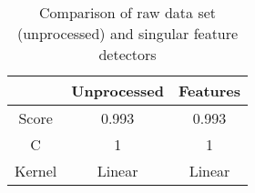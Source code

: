 \begin{comment}
Potentially move "all this failed and went wrong" here
\end{comment}



\begin{table}[tbp]
	\centering
	\begin{tabular}{| c | c | c |}
		\hline
		~ 			& Unprocessed		& Features	\\ \hline
		Score 		& 0.993				& 0.993		\\ \hline
		C			& 1					& 1			\\ \hline
		Kernel		& Linear			& Linear	\\ \hline
	\end{tabular}
	\caption{Comparison of raw data set (unprocessed) and singular feature detectors}
	\label{tab:singular_feature_detector_tex}
\end{table}

\begin{comment}
\begin{table}[tbp]
\centering
\begin{tabular}{| c | c | c | c | c | c | c | c |}
\hline
~ 					& Code sample	& Numerical		& Hexadecimal	& Homework		& Link 		& Tags	\\ \hline
Score 				& 0.783			& 0.796			& 0.793			& 0.794			& 0.795 	& 0.757	\\ \hline
C					& 1000			& 1000			& 1000			& 1000			& 1000 		& 1000	\\ \hline
Gamma ($\gamma$)	& 0.001			& 0.001			& 0.001			& 0.001			& 0.001 	& 0.001	\\ \hline
Kernel				& RBF			& RBF			& RBF			& RBF			& RBF 		& RBF	\\ \hline
\end{tabular}
\caption{Comparison of raw data set (unprocessed) and singular feature detectors}
\label{tab:singular_feature_detector_so2}
\end{table}
\end{comment}


